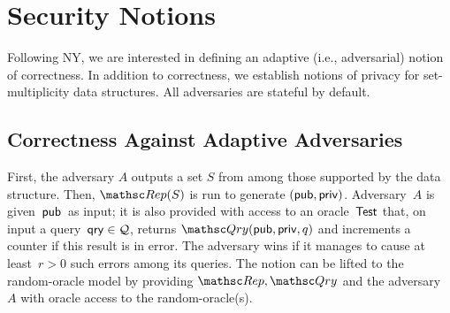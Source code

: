 
\section{Security Notions}
\label{sec:security-notions}
Following NY, we are interested in defining an adaptive (i.e.,
adversarial) notion of correctness.
In addition to correctness, we establish notions of privacy for
set-multiplicity data structures.
All adversaries are stateful by default.


\subsection{Correctness Against Adaptive Adversaries}

First, the adversary $A$ outputs a set $S$ from among those supported by
the data structure. Then,
$\Rep(S)$ is run to generate $({\sf pub},{\sf priv})$.
Adversary~$A$ is given~${\sf pub}$~as input; it is also
provided with access to an oracle~$\mathsf{Test}$ that, on input a query~$\mathsf{qry} \in {\cal Q}$,
returns $\Qry(\pubaux,\privaux,q)$ and increments
a counter if this result is in error.  The adversary wins if it
manages to cause at least~$r>0$ such errors among its queries.
The notion can be lifted to the random-oracle model by providing
$\Rep,\Qry$ and the adversary~$A$ with oracle access to the
random-oracle(s).





